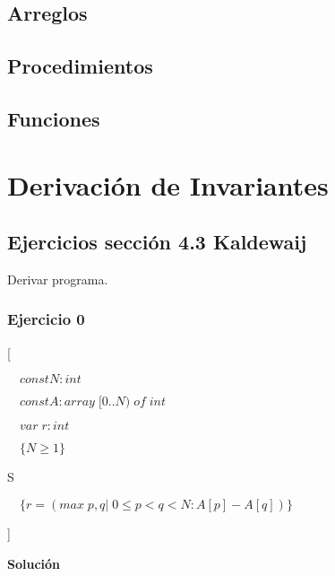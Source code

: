\documentclass[hidelinks]{article}
\begin{document}
\subsection{Arreglos}\par

\subsection{Procedimientos}\par 

\subsection{Funciones}\par

\newpage

\section{Derivación de Invariantes}

\subsection{Ejercicios sección 4.3 Kaldewaij} \par

Derivar programa.\par


\subsubsection{Ejercicio 0}
[\par
$\quad const N: int$\par
$\quad const A: array \; [0..N) \; of \; int$\par
$\quad var \; r: int$\par
$\quad \{N \geq 1\}$\par
\hspace{1em} S \par
$\quad \{r =(max \; p,q| \; 0 \leq p < q < N : A[p] - A[q])\}$ \par
]

\newpage

\textbf{Solución}
\end{document}
